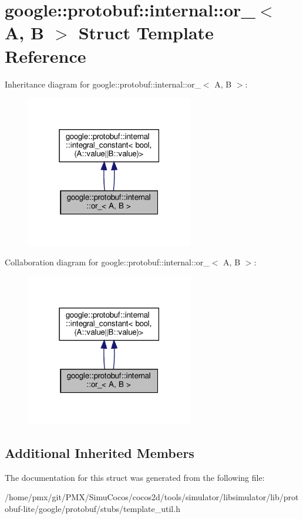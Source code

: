 \hypertarget{structgoogle_1_1protobuf_1_1internal_1_1or__}{}\section{google\+:\+:protobuf\+:\+:internal\+:\+:or\+\_\+$<$ A, B $>$ Struct Template Reference}
\label{structgoogle_1_1protobuf_1_1internal_1_1or__}


Inheritance diagram for google\+:\+:protobuf\+:\+:internal\+:\+:or\+\_\+$<$ A, B $>$\+:
\nopagebreak
\begin{figure}[H]
\begin{center}
\leavevmode
\includegraphics[width=207pt]{structgoogle_1_1protobuf_1_1internal_1_1or____inherit__graph}
\end{center}
\end{figure}


Collaboration diagram for google\+:\+:protobuf\+:\+:internal\+:\+:or\+\_\+$<$ A, B $>$\+:
\nopagebreak
\begin{figure}[H]
\begin{center}
\leavevmode
\includegraphics[width=207pt]{structgoogle_1_1protobuf_1_1internal_1_1or____coll__graph}
\end{center}
\end{figure}
\subsection*{Additional Inherited Members}


The documentation for this struct was generated from the following file\+:\begin{DoxyCompactItemize}
\item 
/home/pmx/git/\+P\+M\+X/\+Simu\+Cocos/cocos2d/tools/simulator/libsimulator/lib/protobuf-\/lite/google/protobuf/stubs/template\+\_\+util.\+h\end{DoxyCompactItemize}
